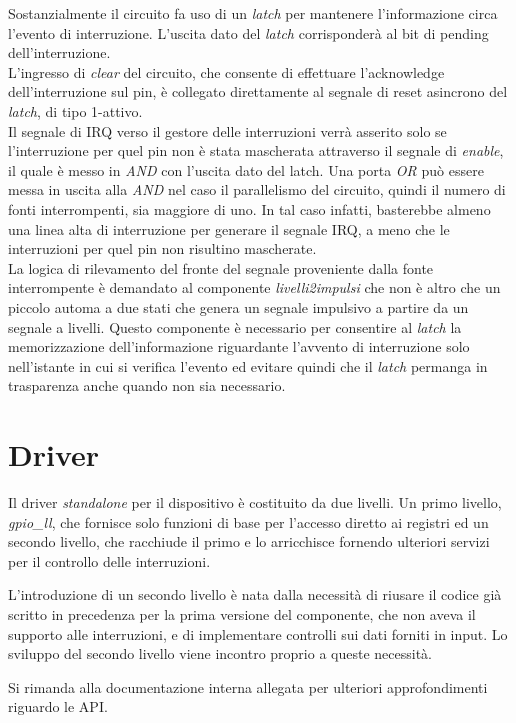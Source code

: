 \documentclass[12pt,a4paper,twoside,openany]{book}
\begin{document}
Sostanzialmente il circuito fa uso di un \textit{latch} per mantenere l'informazione circa l'evento di interruzione. L'uscita dato del \textit{latch} corrisponderà al bit di pending dell'interruzione.\\
L'ingresso di \textit{clear} del circuito, che consente di effettuare l'acknowledge dell'interruzione sul pin, è collegato direttamente al segnale di reset asincrono del \textit{latch}, di tipo 1-attivo.\\
Il segnale di IRQ verso il gestore delle interruzioni verrà asserito solo se l'interruzione per quel pin non è stata mascherata attraverso il segnale di \textit{enable}, il quale è messo in \textit{AND} con l'uscita dato del latch. Una porta \textit{OR} può essere messa in uscita alla \textit{AND} nel caso il parallelismo del circuito, quindi il numero di fonti interrompenti, sia maggiore di uno. In tal caso infatti, basterebbe almeno una linea alta di interruzione per generare il segnale IRQ, a meno che le interruzioni per quel pin non risultino mascherate.\\
La logica di rilevamento del fronte del segnale proveniente dalla fonte interrompente è demandato al componente \textit{livelli2impulsi} che non è altro che un piccolo automa a due stati che genera un segnale impulsivo a partire da un segnale a livelli. Questo componente è necessario per consentire al \textit{latch} la memorizzazione dell'informazione riguardante l'avvento di interruzione solo nell'istante in cui si verifica l'evento ed evitare quindi che il \textit{latch} permanga in trasparenza anche quando non sia necessario.
\clearpage
\section*{Driver}
Il driver \textit{standalone} per il dispositivo è costituito da due livelli. Un primo livello, \textit{gpio\_ll}, che fornisce solo funzioni di base per l'accesso diretto ai registri ed un secondo livello, che racchiude il primo e lo arricchisce fornendo ulteriori servizi per il controllo delle interruzioni.

L'introduzione di un secondo livello è nata dalla necessità di riusare il codice già scritto in precedenza per la prima versione del componente, che non aveva il supporto alle interruzioni, e di implementare controlli sui dati forniti in input. Lo sviluppo del secondo livello viene incontro proprio a queste necessità.

Si rimanda alla documentazione interna allegata per ulteriori approfondimenti riguardo le API.
\end{document}
